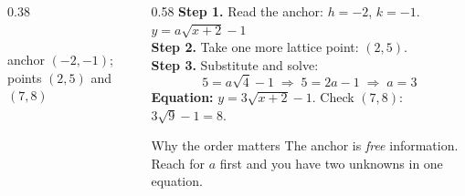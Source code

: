 \documentclass[aspectratio=169, 11pt]{beamer}
\newcommand{\lgrid}[4]{%
  \draw[step=1, linegray!45, thin] (#1,#3) grid (#2,#4);
  \draw[->, thick, charcoal] (#1,0)--(#2,0) node[below right, font=\tiny]{$x$};
  \draw[->, thick, charcoal] (0,#3)--(0,#4) node[left, font=\tiny]{$y$};}
\begin{document}
\begin{frame}[t, plain]
  \begin{columns}[T]
    \begin{column}{0.38\textwidth}
      \centering
      \\[2pt]
      {\scriptsize anchor $(-2,-1)$; \; points $(2,5)$ and $(7,8)$}
    \end{column}
    \begin{column}{0.58\textwidth}
      \footnotesize
      \textbf{Step 1.} Read the anchor: $h=-2$, $k=-1$. \; $y=a\sqrt{x+2}-1$ \\[4pt]
      \textbf{Step 2.} Take one more lattice point: $(2,5)$. \\[4pt]
      \textbf{Step 3.} Substitute and solve:
      \[ 5=a\sqrt{4}-1 \;\Rightarrow\; 5=2a-1 \;\Rightarrow\; a=3 \]
      \textbf{Equation:} $y=3\sqrt{x+2}-1$. \; Check $(7,8)$: $3\sqrt9-1=8$. \checkmark
      \vspace{2pt}
      \begin{block}{Why the order matters}
        The anchor is \emph{free} information. Reach for $a$ first and you have two unknowns in one
        equation.
      \end{block}
    \end{column}
  \end{columns}
\end{frame}
\end{document}
